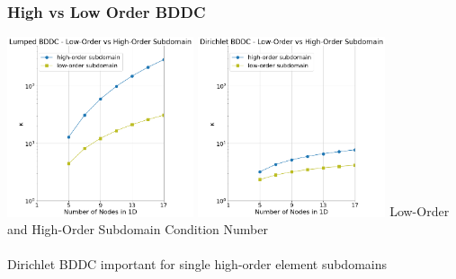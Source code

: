 \documentclass{beamer}
\begin{document}
\begin{frame}
\begin{center}
\frametitle{High vs Low Order BDDC}

\includegraphics[height=5.3cm]{../img/lowVsHighLumped_tall}
\hspace{0.3cm}
\includegraphics[height=5.3cm]{../img/lowVsHighDirichlet_tall}
{\small Low-Order and High-Order Subdomain Condition Number}\\

~\\

Dirichlet BDDC important for single high-order element subdomains

\end{center}
\end{frame}

\end{document}
